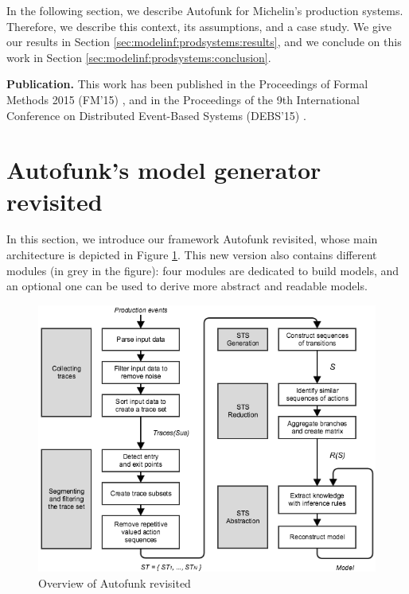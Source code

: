 In the following section, we describe Autofunk for Michelin's
production systems. Therefore, we describe this context, its
assumptions, and a case study. We give our results in Section
\ref{sec:modelinf:prodsystems:results}, and we conclude on this
work in Section \ref{sec:modelinf:prodsystems:conclusion}.

\textbf{Publication.} This work has been published in the
Proceedings of Formal Methods 2015 (FM'15)
\cite{DBLP:conf/fm/DurandS15}, and in the Proceedings of the 9th
International Conference on Distributed Event-Based Systems
(DEBS'15) \cite{DBLP:conf/debs/SalvaD15}.


\section{Autofunk's model generator revisited}
\label{sec:modelinf:prodsystems}

In this section, we introduce our framework Autofunk revisited,
whose main architecture is depicted in Figure
\ref{fig:prodsystems:autofunk-overview}. This new version also
contains different modules (in grey in the figure): four modules
are dedicated to build models, and an optional one can be used to
derive more abstract and readable models.

\begin{figure}[ht]
\includegraphics[width=1.0\linewidth]{figures/autofunk.png}

\caption{Overview of Autofunk revisited}
\label{fig:prodsystems:autofunk-overview}
\end{figure}

